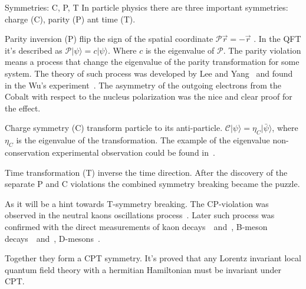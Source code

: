\documentclass[../main.tex]{subfiles}
\begin{document}
\begin{bclogo}[couleur=blue!2, arrondi=0.1, logo=\bcinfo, nobreak=true]{Symmetries: C, P, T}
In particle physics there are three important symmetries: charge (C), parity (P) ant time (T).

Parity inversion (P) flip the sign of the spatial coordinate $\mathcal{P}\overrightarrow{r}=-\overrightarrow{r}$ . In the QFT it's described as $\mathcal{P}\lvert\psi\rangle=c\lvert\psi\rangle$. Where $c$ is the eigenvalue of $\mathcal{P}$. The parity violation means a process that change the eigenvalue of the parity transformation for some system. The theory of such process was developed by Lee and Yang~\cite{Lee1956} and found in the Wu's experiment~\cite{Wu1957}. The asymmetry of the outgoing electrons from the Cobalt with respect to the nucleus polarization was the nice and clear proof for the effect.

Charge symmetry (C) transform particle to its anti-particle. $\mathcal{C}\lvert\psi\rangle=\eta_{C}\lvert\bar{\psi}\rangle$, where $\eta_{C}$ is the eigenvalue of the transformation. The example of the eigenvalue non-conservation experimental observation could be found in~\cite{Gormley1968}.

Time transformation (T) inverse the time direction. After the discovery of the separate P and C violations the combined symmetry breaking became the puzzle.

As it will be a hint towards T-symmetry breaking. The CP-violation was observed in the neutral kaons oscillations process~\cite{Christenson1964}. Later such process was confirmed with the direct measurements of kaon decays~\cite{AlaviHarati1999}~and~\cite{Fanti1999}, B-meson decays~\cite{Aubert2001}~and~\cite{Abe2001}, D-mesons~\cite{Aaij2019}.

Together they form a CPT symmetry. It's proved that any Lorentz invariant local quantum field theory with a hermitian Hamiltonian must be invariant under CPT.
\end{bclogo}
\end{document}
